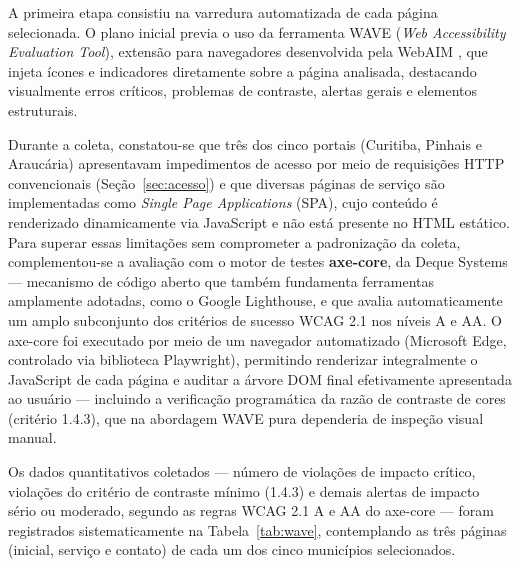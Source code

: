 \documentclass[brazil]{ifpr-pinhais}
\begin{document}
A primeira etapa consistiu na varredura automatizada de cada página selecionada. O plano inicial previa o uso da ferramenta WAVE (\textit{Web Accessibility Evaluation Tool}), extensão para navegadores desenvolvida pela WebAIM \cite{webaim2026wave}, que injeta ícones e indicadores diretamente sobre a página analisada, destacando visualmente erros críticos, problemas de contraste, alertas gerais e elementos estruturais.

Durante a coleta, constatou-se que três dos cinco portais (Curitiba, Pinhais e Araucária) apresentavam impedimentos de acesso por meio de requisições HTTP convencionais (Seção~\ref{sec:acesso}) e que diversas páginas de serviço são implementadas como \textit{Single Page Applications} (SPA), cujo conteúdo é renderizado dinamicamente via JavaScript e não está presente no HTML estático. Para superar essas limitações sem comprometer a padronização da coleta, complementou-se a avaliação com o motor de testes \textbf{axe-core}, da Deque Systems \cite{axecore2026} --- mecanismo de código aberto que também fundamenta ferramentas amplamente adotadas, como o Google Lighthouse, e que avalia automaticamente um amplo subconjunto dos critérios de sucesso WCAG 2.1 nos níveis A e AA. O axe-core foi executado por meio de um navegador automatizado (Microsoft Edge, controlado via biblioteca Playwright), permitindo renderizar integralmente o JavaScript de cada página e auditar a árvore DOM final efetivamente apresentada ao usuário --- incluindo a verificação programática da razão de contraste de cores (critério 1.4.3), que na abordagem WAVE pura dependeria de inspeção visual manual.

Os dados quantitativos coletados --- número de violações de impacto crítico, violações do critério de contraste mínimo (1.4.3) e demais alertas de impacto sério ou moderado, segundo as regras WCAG 2.1 A e AA do axe-core --- foram registrados sistematicamente na Tabela~\ref{tab:wave}, contemplando as três páginas (inicial, serviço e contato) de cada um dos cinco municípios selecionados.
\end{document}
